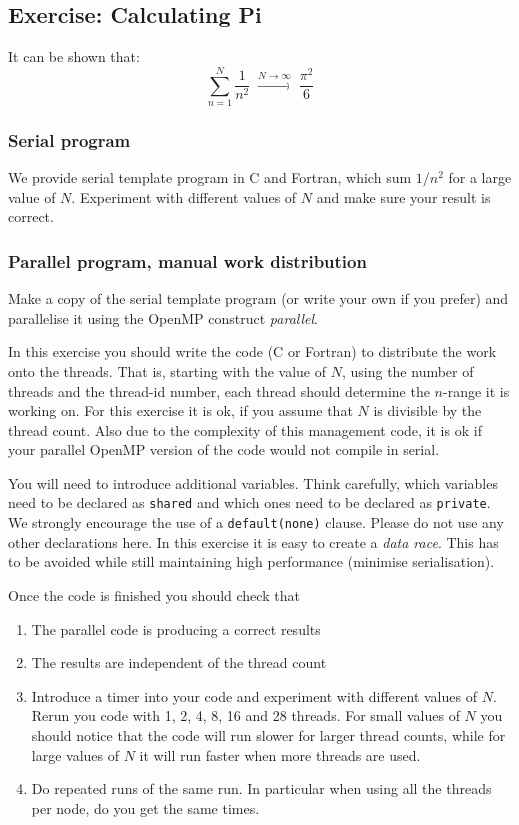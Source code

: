 \subsection{Exercise: Calculating Pi} \label{calcPiAtomicExercise}
It can be shown that:
\begin{equation}
\sum_{n=1}^N \frac{1}{n^2} \;\stackrel{N \to \infty}{\longrightarrow}
\;\frac{\pi^2}{6}
\end{equation}

\subsubsection{Serial program}
We provide serial template program in C and Fortran, which sum $1/n^2$ for a large value of $N$.  Experiment with different values of $N$ and make sure your result is correct.

\subsubsection{Parallel program, manual work distribution}\label{PiManual}
Make a copy of the serial template program (or write your own if you prefer) and parallelise it using the OpenMP construct \textit{parallel}.  

In this exercise you should write the code (C or Fortran) to distribute the work onto the threads. That is, starting with the value of $N$, using the number of threads and the thread-id number, each thread should determine the $n$-range it is working on.  For this exercise it is ok, if you assume that $N$ is divisible by the thread count.  Also due to the complexity of this management code, it is ok if your parallel OpenMP version of the  code would not compile in serial.

You will need to introduce additional variables.  Think carefully, which variables need to be declared as \texttt{shared} and which ones need to be declared as \texttt{private}.  We strongly encourage the use of a \verb+default(none)+ clause.  Please do not use any other declarations here.  In this exercise it is easy to create a \textit{data race}.  This has to be avoided while still maintaining high performance (minimise serialisation).

Once the code is finished you should check that 
\begin{enumerate}
\item The parallel code is producing a correct results
\item The results are independent of the thread count
\item Introduce a timer into your code and experiment with different values of $N$.  Rerun you code with 1, 2, 4, 8, 16 and 28 threads.  For small values of $N$ you should notice that the code will run slower for larger thread counts, while for large values of $N$ it will run faster when more threads are used.
\item \label{runtimePi} Do repeated runs of the same run. In particular when using all the threads per  node, do you get the same times.
\end{enumerate}
